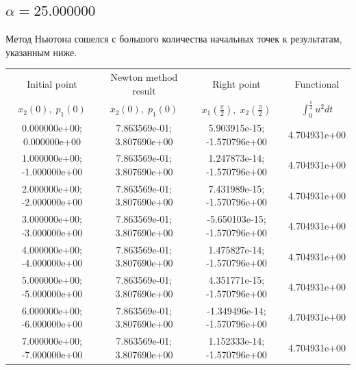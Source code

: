 \documentclass[titlepage]{article}
\def\l{\left}
\def\r{\right}
\begin{document}
\subsection{$\alpha = 25.000000$} 
Метод Ньютона сошелся с большого количества начальных точек к результатам, указанным ниже. \\ 
\begin{tabular}{ | c | c | c | c |} 
\hline 
Initial point  & Newton method result & Right point & Functional 
 \\ $x_2(0), \; p_1(0)$ & $x_2(0), \; p_1(0)$ & $x_1\l(\frac{\pi}{2}\r), \; x_2\l(\frac{\pi}{2}\r)$ & $\int_{0}^{\frac{\pi}{2}}u^2dt$  \\ \hline 
0.000000e+00; 0.000000e+00 & 7.863569e-01; 3.807690e+00 & 5.903915e-15; -1.570796e+00 & 4.704931e+00 \\ \hline 
1.000000e+00; -1.000000e+00 & 7.863569e-01; 3.807690e+00 & 1.247873e-14; -1.570796e+00 & 4.704931e+00 \\ \hline 
2.000000e+00; -2.000000e+00 & 7.863569e-01; 3.807690e+00 & 7.431989e-15; -1.570796e+00 & 4.704931e+00 \\ \hline 
3.000000e+00; -3.000000e+00 & 7.863569e-01; 3.807690e+00 & -5.650103e-15; -1.570796e+00 & 4.704931e+00 \\ \hline 
4.000000e+00; -4.000000e+00 & 7.863569e-01; 3.807690e+00 & 1.475827e-14; -1.570796e+00 & 4.704931e+00 \\ \hline 
5.000000e+00; -5.000000e+00 & 7.863569e-01; 3.807690e+00 & 4.351771e-15; -1.570796e+00 & 4.704931e+00 \\ \hline 
6.000000e+00; -6.000000e+00 & 7.863569e-01; 3.807690e+00 & -1.349496e-14; -1.570796e+00 & 4.704931e+00 \\ \hline 
7.000000e+00; -7.000000e+00 & 7.863569e-01; 3.807690e+00 & 1.152333e-14; -1.570796e+00 & 4.704931e+00 \\ \hline 
\end{tabular} 
\end{document}
